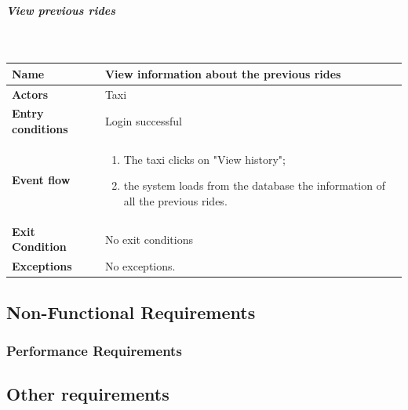 \subparagraph{View previous rides}
~\\[0.2cm]
\vspace{20pt}
\noindent
\begin{tabular}{l l}
 \textbf {Name} & View information about the previous rides  \\ \hline
 \textbf{Actors} & Taxi \\ \hline
 \textbf{Entry conditions} & Login successful \\ \hline
 \textbf{Event flow} & 
 \parbox{0.7\textwidth}{
 \begin{enumerate}
 \item The taxi clicks on "View history";
 \item the system loads from the database the information of all the previous rides.
 \end{enumerate}
 } \\ \hline
 \textbf{Exit Condition} & No exit conditions \\ \hline
 \textbf{Exceptions} & No exceptions.
\end{tabular}

	\subsection{Non-Functional Requirements}
		\subsubsection{Performance Requirements}
	\subsection{Other requirements}
	